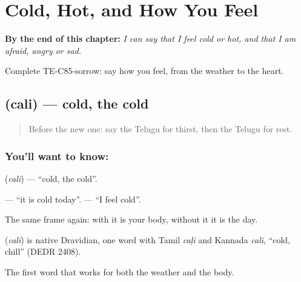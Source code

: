 
\chapter{Cold, Hot, and How You Feel}
\label{ch:te-cold-hot-feel}

\begin{chapteropening}
\textbf{By the end of this chapter:} \emph{I can say that I feel cold or hot, and that I am afraid, angry or sad.}

Complete TE-C85-sorrow: say how you feel, from the weather to the heart.
\end{chapteropening}

\section[\texorpdfstring{\te{చలి} (cali)}{చలి (cali)}]{ (cali) — cold, the cold}

\label{lesson:TE-C85-cold}



\begin{quote}
Before the new one: say the Telugu for thirst, then the Telugu for rest.
\end{quote}

\subsection*{You'll want to know: }
\textbf{} (\emph{cali}) — \textquotedblleft{}cold, the cold\textquotedblright{}.

\textbf{  } — \textquotedblleft{}it is cold today\textquotedblright{}. \textbf{  } — \textquotedblleft{}I feel cold\textquotedblright{}.

The same frame again: with  it is your body, without it it is the day.

\begin{cousinweb}
\textbf{} (\emph{cali}) is native Dravidian, one word with Tamil \emph{caḷi} and Kannada \emph{cali}, \textquotedblleft{}cold, chill\textquotedblright{} (DEDR 2408).
\end{cousinweb}

\begin{grammarlens}[title={What you've built}]
The first word that works for both the weather and the body.
\end{grammarlens}

